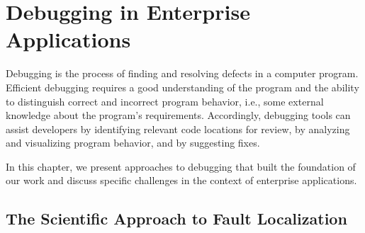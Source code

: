 %
%



\chapter{Debugging in Enterprise Applications}

Debugging is the process of finding and resolving defects in a computer program.
Efficient debugging requires a good understanding of the program and the ability to distinguish correct and incorrect program behavior, i.e., some external knowledge about the program's requirements.
Accordingly, debugging tools can assist developers by identifying relevant code locations for review, by analyzing and visualizing program behavior, and by suggesting fixes.

In this chapter, we present approaches to debugging that built the foundation of our work and discuss specific challenges in the context of enterprise applications.

\section{The Scientific Approach to Fault Localization}

